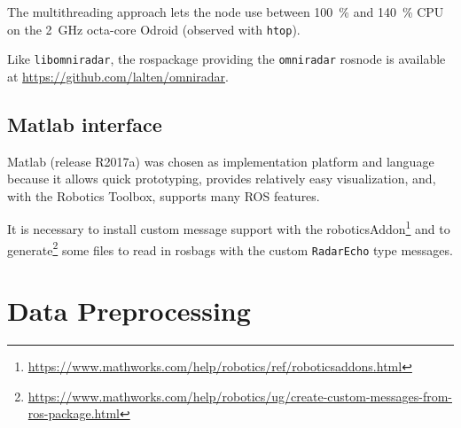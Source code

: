 \begin{samepage}
\begin{Shaded}
\begin{Highlighting}[]

\NormalTok{    [=] ()}
\NormalTok{    \{}
\NormalTok{    \}}
\NormalTok{);}
\end{Highlighting}
\end{Shaded}
\end{samepage}

The multithreading approach lets the node use between \SI{100}{\%} and \SI{140}{\%}
CPU on the \SI{2}{GHz} octa-core Odroid (observed with \texttt{htop}).

Like \texttt{libomniradar}, the rospackage providing the \texttt{omniradar} rosnode is available at \url{https://github.com/lalten/omniradar}.

\subsection{Matlab interface}\label{matlab}

Matlab (release R2017a) was chosen as implementation platform and language because it allows quick prototyping, provides relatively easy visualization, and, with the Robotics Toolbox, supports many ROS features.

It is necessary to install custom message support with the roboticsAddon\footnote{\url{https://www.mathworks.com/help/robotics/ref/roboticsaddons.html}} and to generate\footnote{\url{https://www.mathworks.com/help/robotics/ug/create-custom-messages-from-ros-package.html}} some files to read in rosbags with the custom \texttt{RadarEcho} type messages.

\section{Data Preprocessing}\label{data-preprocessing}

